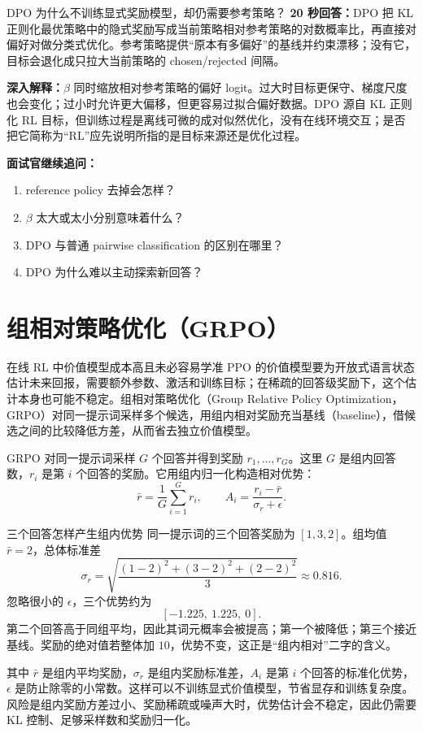 \begin{interviewbox}{DPO 为什么不训练显式奖励模型，却仍需要参考策略？}
\textbf{20 秒回答：}DPO 把 KL 正则化最优策略中的隐式奖励写成当前策略相对参考策略的对数概率比，再直接对偏好对做分类式优化。参考策略提供“原本有多偏好”的基线并约束漂移；没有它，目标会退化成只拉大当前策略的 chosen/rejected 间隔。

\textbf{深入解释：}$\beta$ 同时缩放相对参考策略的偏好 logit。过大时目标更保守、梯度尺度也会变化；过小时允许更大偏移，但更容易过拟合偏好数据。DPO 源自 KL 正则化 RL 目标，但训练过程是离线可微的成对似然优化，没有在线环境交互；是否把它简称为“RL”应先说明所指的是目标来源还是优化过程。

\textbf{面试官继续追问：}
\begin{enumerate}
  \item reference policy 去掉会怎样？
  \item $\beta$ 太大或太小分别意味着什么？
  \item DPO 与普通 pairwise classification 的区别在哪里？
  \item DPO 为什么难以主动探索新回答？
\end{enumerate}
\end{interviewbox}

\section{组相对策略优化（GRPO）}
\label{sec:grpo}

\begin{motivationbox}{在线 RL 中价值模型成本高且未必容易学准}
PPO 的价值模型要为开放式语言状态估计未来回报，需要额外参数、激活和训练目标；在稀疏的回答级奖励下，这个估计本身也可能不稳定。组相对策略优化（Group Relative Policy Optimization，GRPO）对同一提示词采样多个候选，用组内相对奖励充当基线（baseline），借候选之间的比较降低方差，从而省去独立价值模型。
\end{motivationbox}

GRPO 对同一提示词采样 $G$ 个回答并得到奖励 $r_1,\ldots,r_G$。这里 $G$ 是组内回答数，$r_i$ 是第 $i$ 个回答的奖励。它用组内归一化构造相对优势：
\[
\bar r=\frac{1}{G}\sum_{i=1}^{G}r_i,\qquad
A_i=\frac{r_i-\bar r}{\sigma_r+\epsilon}.
\]

\begin{examplebox}{三个回答怎样产生组内优势}
同一提示词的三个回答奖励为 $[1,3,2]$。组均值 $\bar r=2$，总体标准差
\[
\sigma_r=\sqrt{\frac{(1-2)^2+(3-2)^2+(2-2)^2}{3}}
\approx0.816.
\]
忽略很小的 $\epsilon$，三个优势约为
\[
[-1.225,\ 1.225,\ 0].
\]
第二个回答高于同组平均，因此其词元概率会被提高；第一个被降低；第三个接近基线。奖励的绝对值若整体加 $10$，优势不变，这正是“组内相对”二字的含义。
\end{examplebox}
其中 $\bar r$ 是组内平均奖励，$\sigma_r$ 是组内奖励标准差，$A_i$ 是第 $i$ 个回答的标准化优势，$\epsilon$ 是防止除零的小常数。这样可以不训练显式价值模型，节省显存和训练复杂度。风险是组内奖励方差过小、奖励稀疏或噪声大时，优势估计会不稳定，因此仍需要 KL 控制、足够采样数和奖励归一化。

